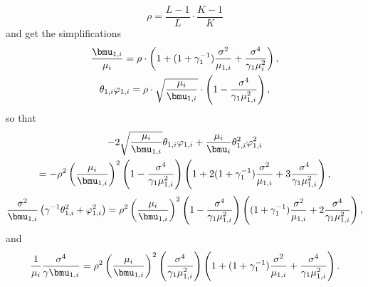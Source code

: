 \[
    \rho
        =
            \frac{L-1}{L}
            \cdot
            \frac{K-1}{K}
\]
and get the simplifications
\begin{gather*}
    \frac{\bmu_{1,i}}{\mu_i}
        =
            \rho
            \cdot
            \left(
                1
                +
                (1 + \gamma_1^{-1})
                \frac{\sigma^2}{\mu_{1,i}}
                +
                \frac{\sigma^4}{\gamma_1 \mu_i^2}
            \right), \\
    \theta_{1,i} \varphi_{1,i}
        =
            \rho
            \cdot
            \sqrt{\frac{\mu_i}{\bmu_{1,i}}}
            \cdot
            \left(
                1
                -
                \frac{\sigma^4}{\gamma_1 \mu_{1,i}^2}
            \right),
\end{gather*}
so that
\begin{multline*}
    -2 \sqrt{\frac{\mu_i}{\bmu_{1,i}}} \theta_{1,i} \varphi_{1,i}
    +
    \frac{\mu_i}{\bmu_i} \theta_{1,i}^2 \varphi_{1,i}^2 \\
        =
            -
            \rho^2
            \left(
                \frac{\mu_i}{\bmu_{1,i}}
            \right)^2
            \left(
                1
                -
                \frac{\sigma^4}{\gamma_1 \mu_{1,i}^2}
            \right)
            \left(
                1
                +
                2( 1 + \gamma_1^{-1}) \frac{\sigma^2}{\mu_{1,i}}
                +
                3
                \frac{\sigma^4}{\gamma_1 \mu_{1,i}^2}
            \right),
\end{multline*}
\[
    \frac{\sigma^2}{\bmu_{1,i}}
    \left(
        \gamma^{-1} \theta_{1,i}^2
        +
        \varphi_{1,i}^2
    \right)
        =
            \rho^2
            \left(
                \frac{\mu_i}{\bmu_{1,i}}
            \right)^2
            \left(
                1
                -
                \frac{\sigma^4}{\gamma_1 \mu_{1,i}^2}
            \right)
            \left(
                (1 + \gamma_1^{-1})
                \frac{\sigma^2}{\mu_{1,i}}
                +
                2
                \frac{\sigma^4}{\gamma_1 \mu_{1,i}^2}
            \right),
\]
and
\[
    \frac{1}{\mu_i}
    \frac{\sigma^4}{\gamma \bmu_{1,i}}
        =
            \rho^2
            \left(
                \frac{\mu_i}{\bmu_{1,i}}
            \right)^2
            \left(
                \frac{\sigma^4}{\gamma_1 \mu_{1,i}^2}
            \right)
            \left(
                1
                +
                (1 + \gamma_1^{-1})
                \frac{\sigma^2}{\mu_{1,i}}
                +
                \frac{\sigma^4}{\gamma_1 \mu_{1,i}^2}
            \right).
\]
